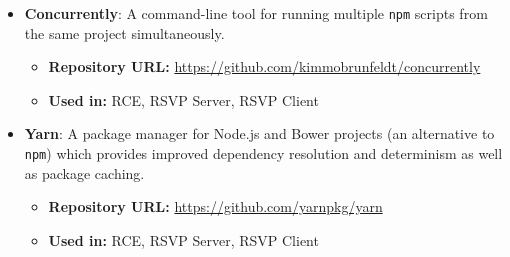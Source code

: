 \begin{itemize}
    \item \textbf{Concurrently}: A command-line tool for running multiple \texttt{npm} scripts from the same project simultaneously.
      \begin{itemize}
        \item \textbf{Repository URL:} \url{https://github.com/kimmobrunfeldt/concurrently}
        \item \textbf{Used in:} RCE, RSVP Server, RSVP Client
      \end{itemize}
      
    \item \textbf{Yarn}: A package manager for Node.js and Bower projects (an alternative to \texttt{npm}) which provides improved dependency resolution and determinism as well as package caching.
      \begin{itemize}
        \item \textbf{Repository URL:} \url{https://github.com/yarnpkg/yarn}
        \item \textbf{Used in:} RCE, RSVP Server, RSVP Client
      \end{itemize}
    \end{itemize}
    
